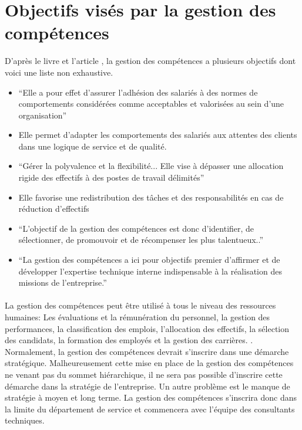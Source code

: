 \section{Objectifs visés par la gestion des compétences}
D'après le livre\citep{gestionressourceshumaine2007} et l'article \citep{delobbe}, la gestion des compétences a plusieurs objectifs dont voici une liste non exhaustive.
\begin{itemize}
    \item \enquote{Elle a pour effet d'assurer l'adhésion des salariés à des normes de comportements considérées comme acceptables et valorisées au sein d'une organisation}\citep[p.40]{delobbe}
    \item Elle permet d'adapter les comportements des salariés aux attentes des clients dans une logique de service et de qualité. \citep[182]{gestionressourceshumaine2007}
    \item \enquote{Gérer la polyvalence et la flexibilité... Elle vise à dépasser une allocation rigide des effectifs à des postes de travail délimités}\citep[p.41]{delobbe}
    \item Elle favorise une redistribution des tâches et des responsabilités en cas de réduction d'effectifs \citep[182]{gestionressourceshumaine2007}
    \item  \enquote{L'objectif de la gestion des compétences est donc d'identifier, de sélectionner, de promouvoir et de récompenser les plus talentueux..}\citep[p.43]{delobbe}
    \item  \enquote{La gestion des compétences a ici pour objectifs premier d'affirmer et de développer l'expertise technique interne indispensable à la réalisation des missions de l'entreprise.} \citep[p.45]{delobbe}

\end{itemize}

\paragraph{}La gestion des compétences peut être utilisé à tous le niveau des ressources humaines: Les évaluations et la rémunération du personnel, la gestion des performances, la classification des emplois, l'allocation des effectifs, la sélection des candidats, la formation des employés et la gestion des carrières. \citep[p.32]{delobbe}. Normalement, la gestion des compétences devrait s'inscrire dans une démarche stratégique. Malheureusement cette mise en place de la gestion des compétences ne venant pas du sommet hiérarchique, il ne sera pas possible d'inscrire cette démarche dans la stratégie de l'entreprise. Un autre problème est le manque de stratégie à moyen et long terme.  La gestion des compétences s'inscrira donc dans la limite du département de service et commencera avec l'équipe des consultants techniques. 

